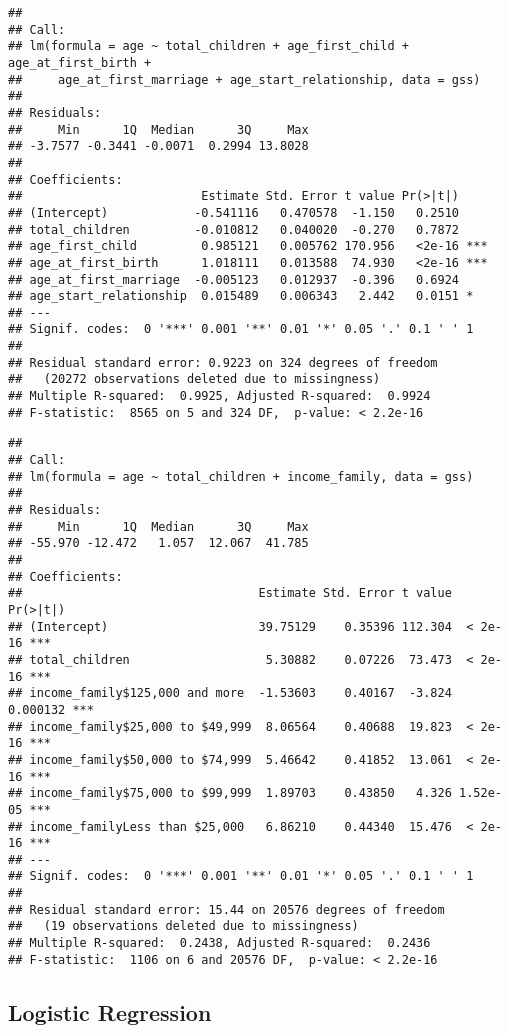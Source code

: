 \documentclass[
]{article}
\begin{document}
\begin{verbatim}
## 
## Call:
## lm(formula = age ~ total_children + age_first_child + age_at_first_birth + 
##     age_at_first_marriage + age_start_relationship, data = gss)
## 
## Residuals:
##     Min      1Q  Median      3Q     Max 
## -3.7577 -0.3441 -0.0071  0.2994 13.8028 
## 
## Coefficients:
##                         Estimate Std. Error t value Pr(>|t|)    
## (Intercept)            -0.541116   0.470578  -1.150   0.2510    
## total_children         -0.010812   0.040020  -0.270   0.7872    
## age_first_child         0.985121   0.005762 170.956   <2e-16 ***
## age_at_first_birth      1.018111   0.013588  74.930   <2e-16 ***
## age_at_first_marriage  -0.005123   0.012937  -0.396   0.6924    
## age_start_relationship  0.015489   0.006343   2.442   0.0151 *  
## ---
## Signif. codes:  0 '***' 0.001 '**' 0.01 '*' 0.05 '.' 0.1 ' ' 1
## 
## Residual standard error: 0.9223 on 324 degrees of freedom
##   (20272 observations deleted due to missingness)
## Multiple R-squared:  0.9925, Adjusted R-squared:  0.9924 
## F-statistic:  8565 on 5 and 324 DF,  p-value: < 2.2e-16
\end{verbatim}

\begin{verbatim}
## 
## Call:
## lm(formula = age ~ total_children + income_family, data = gss)
## 
## Residuals:
##     Min      1Q  Median      3Q     Max 
## -55.970 -12.472   1.057  12.067  41.785 
## 
## Coefficients:
##                                 Estimate Std. Error t value Pr(>|t|)    
## (Intercept)                     39.75129    0.35396 112.304  < 2e-16 ***
## total_children                   5.30882    0.07226  73.473  < 2e-16 ***
## income_family$125,000 and more  -1.53603    0.40167  -3.824 0.000132 ***
## income_family$25,000 to $49,999  8.06564    0.40688  19.823  < 2e-16 ***
## income_family$50,000 to $74,999  5.46642    0.41852  13.061  < 2e-16 ***
## income_family$75,000 to $99,999  1.89703    0.43850   4.326 1.52e-05 ***
## income_familyLess than $25,000   6.86210    0.44340  15.476  < 2e-16 ***
## ---
## Signif. codes:  0 '***' 0.001 '**' 0.01 '*' 0.05 '.' 0.1 ' ' 1
## 
## Residual standard error: 15.44 on 20576 degrees of freedom
##   (19 observations deleted due to missingness)
## Multiple R-squared:  0.2438, Adjusted R-squared:  0.2436 
## F-statistic:  1106 on 6 and 20576 DF,  p-value: < 2.2e-16
\end{verbatim}

\hypertarget{logistic-regression}{%
\subsection{Logistic Regression}\label{logistic-regression}}
\end{document}
